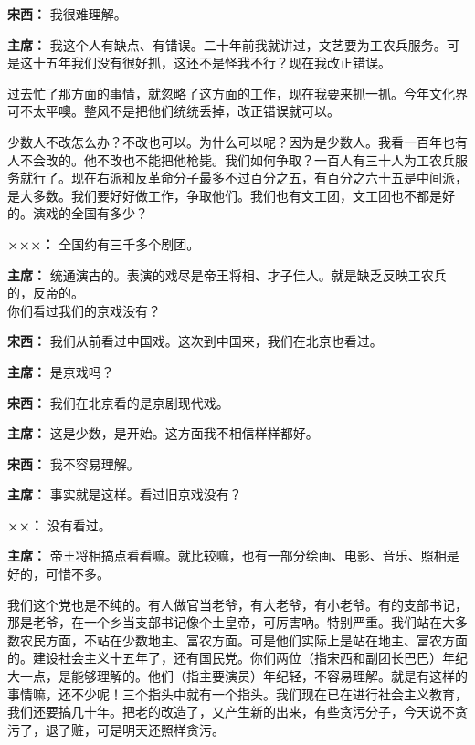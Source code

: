 \begin{list}{}
\item[\textbf{宋西：}] 我很难理解。

\item[\textbf{主席：}] 我这个人有缺点、有错误。二十年前我就讲过，文艺要为工农兵服务。可是这十五年我们没有很好抓，这还不是怪我不行？现在我改正错误。

过去忙了那方面的事情，就忽略了这方面的工作，现在我要来抓一抓。今年文化界可不太平噢。整风不是把他们统统丢掉，改正错误就可以。

少数人不改怎么办？不改也可以。为什么可以呢？因为是少数人。我看一百年也有人不会改的。他不改也不能把他枪毙。我们如何争取？一百人有三十人为工农兵服务就行了。现在右派和反革命分子最多不过百分之五，有百分之六十五是中间派，是大多数。我们要好好做工作，争取他们。我们也有文工团，文工团也不都是好的。演戏的全国有多少？

\item[\textbf{×××：}] 全国约有三千多个剧团。

\item[\textbf{主席：}] 统通演古的。表演的戏尽是帝王将相、才子佳人。就是缺乏反映工农兵的，反帝的。\\
你们看过我们的京戏没有？

\item[\textbf{宋西：}] 我们从前看过中国戏。这次到中国来，我们在北京也看过。

\item[\textbf{主席：}] 是京戏吗？

\item[\textbf{宋西：}] 我们在北京看的是京剧现代戏。

\item[\textbf{主席：}] 这是少数，是开始。这方面我不相信样样都好。

\item[\textbf{宋西：}] 我不容易理解。

\item[\textbf{主席：}] 事实就是这样。看过旧京戏没有？

\item[\textbf{××：}] 没有看过。

\item[\textbf{主席：}] 帝王将相搞点看看嘛。就比较嘛，也有一部分绘画、电影、音乐、照相是好的，可惜不多。

我们这个党也是不纯的。有人做官当老爷，有大老爷，有小老爷。有的支部书记，那是老爷，在一个乡当支部书记像个土皇帝，可厉害吶。特别严重。我们站在大多数农民方面，不站在少数地主、富农方面。可是他们实际上是站在地主、富农方面的。建设社会主义十五年了，还有国民党。你们两位（指宋西和副团长巴巴）年纪大一点，是能够理解的。他们（指主要演员）年纪轻，不容易理解。就是有这样的事情嘛，还不少呢！三个指头中就有一个指头。我们现在已在进行社会主义教育，我们还要搞几十年。把老的改造了，又产生新的出来，有些贪污分子，今天说不贪污了，退了赃，可是明天还照样贪污。


\end{list}
